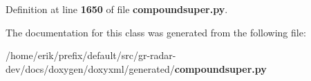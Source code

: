 Definition at line {\bf 1650} of file {\bf compoundsuper.\+py}.



The documentation for this class was generated from the following file\+:\begin{DoxyCompactItemize}
\item 
/home/erik/prefix/default/src/gr-\/radar-\/dev/docs/doxygen/doxyxml/generated/{\bf compoundsuper.\+py}\end{DoxyCompactItemize}
